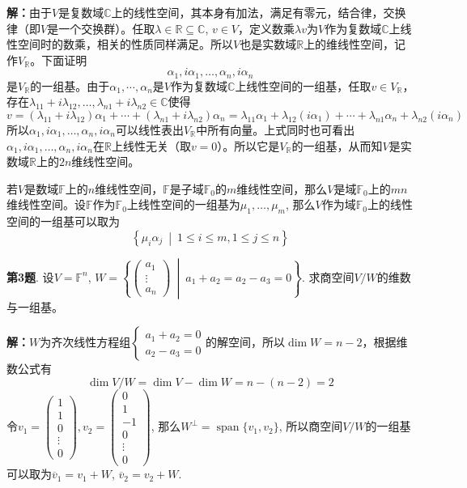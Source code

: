 {\bf 解：}由于$V$是复数域$\mathbb{C}$上的线性空间，其本身有加法，满足有零元，结合律，交换律（即$V$是一个交换群）。任取$\lambda \in \mathbb{R} \subseteq \mathbb{C}$, $v\in V$，定义数乘$\lambda v$为$V$作为复数域$\mathbb{C}$上线性空间时的数乘，相关的性质同样满足。所以$V$也是实数域$\mathbb{R}$上的维线性空间，记作$V_{\mathbb{R}}$。下面证明
$$\alpha_1,i\alpha_1,\ldots,\alpha_n,i\alpha_n$$
是$V_{\mathbb{R}}$的一组基。由于$\alpha_1,\cdots,\alpha_n$是$V$作为复数域$\mathbb{C}$上线性空间的一组基，任取$v\in V_{\mathbb{R}}$，存在$\lambda_{11} + i\lambda_{12}, \ldots, \lambda_{n1} + i\lambda_{n2} \in \mathbb{C}$使得
$$v = (\lambda_{11} + i\lambda_{12})\alpha_1 + \cdots + (\lambda_{n1} + i\lambda_{n2})\alpha_n = \lambda_{11}\alpha_1 + \lambda_{12}(i\alpha_1) + \cdots + \lambda_{n1}\alpha_n + \lambda_{n2}(i\alpha_n)$$
所以$\alpha_1,i\alpha_1,\ldots,\alpha_n,i\alpha_n$可以线性表出$V_{\mathbb{R}}$中所有向量。上式同时也可看出$\alpha_1,i\alpha_1,\ldots,\alpha_n,i\alpha_n$在$\mathbb{R}$上线性无关（取$v=0$）。所以它是$V_{\mathbb{R}}$的一组基，从而知$V$是实数域$\mathbb{R}$上的$2n$维线性空间。

若$V$是数域$\mathbb{F}$上的$n$维线性空间，$\mathbb{F}$是子域$\mathbb{F}_0$的$m$维线性空间，那么$V$是域$\mathbb{F}_0$上的$mn$维线性空间。设$\mathbb{F}$作为$\mathbb{F}_0$上线性空间的一组基为$\mu_1, \ldots, \mu_m$, 那么$V$作为域$\mathbb{F}_0$上的线性空间的一组基可以取为
$$\left\{ \mu_i\alpha_j \ \middle|\ 1 \leqslant i \leqslant m, 1 \leqslant j \leqslant n \right\}$$

\newpageorvspace

{\bf 第3题}. 设$V = \mathbb{F}^n$, $W = \left\{ \begin{pmatrix} a_1 \\ \vdots \\ a_n \end{pmatrix} \ \middle|\ a_1+a_2=a_2-a_3=0 \right\}$. 求商空间$V / W$的维数与一组基。

{\bf 解：}$W$为齐次线性方程组$\begin{cases} a_1+a_2= 0 \\ a_2-a_3=0 \end{cases}$的解空间，所以$\dim W = n-2$，根据维数公式有
$$\dim V/W = \dim V - \dim W = n - (n-2) = 2$$
令$v_1 = \begin{pmatrix} 1 \\ 1 \\ 0 \\ \vdots \\ 0 \end{pmatrix}, v_2 = \begin{pmatrix} 0 \\ 1 \\ -1 \\ 0 \\ \vdots \\ 0 \end{pmatrix}$, 那么$W^{\perp} = \operatorname{span}\{v_1, v_2\}$, 所以商空间$V / W$的一组基可以取为$\overline{v}_1 = v_1 + W$, $\overline{v}_2 = v_2 + W$.

